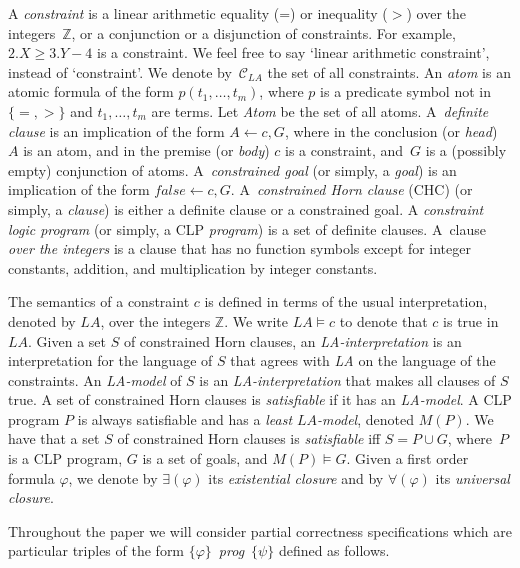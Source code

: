 \documentclass[english]{tlp}
\begin{document}
A \textit{constraint}
is a linear arithmetic equality (=) or inequality ($>$)
over the integers~$\mathbb Z$, or a conjunction
or a disjunction of constraints. For example, 
$2.\!X\!\geq\!3.\!Y\! - 4$ is a constraint.
We feel free to say
`linear arithmetic constraint', instead of `constraint'.
We denote by~$\mathcal C_{{LA}}$ the set of all constraints.
An {\it atom} is an atomic formula of the form $p(t_{1},\ldots,t_{m})$,
where $p$ is a predicate symbol not in $\{=,>\}$ and 
$\mathit{t_{1},\ldots,t_{m}}$ are terms.
Let {\it Atom} be the set of all atoms.
A~{\it definite clause} is an implication of the form  
$A\leftarrow c, G$, where in the conclusion (or {\it head\/}) $A$ is an atom, 
and in the
premise (or {\it body\/}) $c$ is a constraint, and~$G$ is a (possibly empty)
conjunction of atoms.
A~{\it constrained goal} (or simply, a {\it goal}\/) is  an implication of the form  
$\textit{false} \leftarrow c, G$.
A~{\it constrained Horn clause} (CHC) (or simply, a {\it clause}) 
is either a definite 
clause or a constrained goal. 
A {\it constraint logic program} (or simply, a CLP {\it program})  
is a set of definite clauses.
A~clause {\it over the integers} is a clause that has no function 
symbols except for integer constants, addition, and
multiplication by integer constants.

The semantics of a constraint $c$ 
is defined in terms of the usual interpretation, denoted by ${\textit{LA}}$,
over the integers $\mathbb Z$. We write ${\textit{LA}}\models c$ to denote
that $c$ is true in~${\textit{LA}}$.
Given a set $S$ of constrained Horn clauses, an
{\it LA-interpretation} is an interpretation for the language of
$S$ that agrees with {\it LA}
on the language of the constraints.
An {\it LA-model} of  $S$
is an {\it LA-interpretation} that makes all clauses of $S$ true.
A set of constrained Horn clauses is {\it satisfiable} if it has an {\it LA-model}.
A CLP program $P$ is always satisfiable and has a 
{\it least ${\textit{LA}}$-model}, denoted $M(P)$. 
We have that a set $S$ of constrained Horn clauses is {\it satisfiable} iff 
$S\!=\! P \!\cup\! G$, where~$P$ is a CLP program, $G$ is a set  of goals, and
$M(P)\models G$.
Given a first order formula $\varphi$, we denote by $\exists (\varphi)$
its {\it existential closure} and by $\forall (\varphi)$ its 
{\it universal closure}.


Throughout the paper we will consider partial correctness 
specifications which are particular triples of the form
\mbox{$\{\varphi\} $ {\textit{prog}} $
\{\psi\}$} defined as follows.
\vspace{-1mm}
\end{document}
